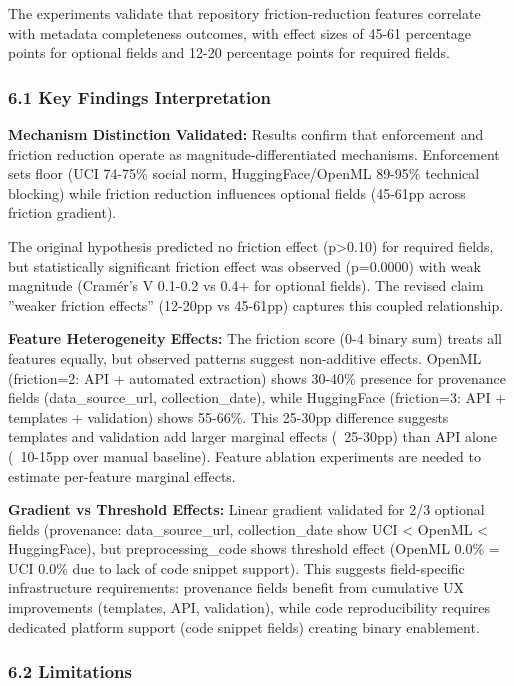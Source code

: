
The experiments validate that repository friction-reduction features correlate with metadata completeness outcomes, with effect sizes of 45-61 percentage points for optional fields and 12-20 percentage points for required fields. 

\subsubsection{6.1 Key Findings Interpretation}

\textbf{Mechanism Distinction Validated:} Results confirm that enforcement and friction reduction operate as magnitude-differentiated mechanisms. Enforcement sets floor (UCI 74-75\% social norm, HuggingFace/OpenML 89-95\% technical blocking) while friction reduction influences optional fields (45-61pp across friction gradient).

The original hypothesis predicted no friction effect (p>0.10) for required fields, but statistically significant friction effect was observed (p=0.0000) with weak magnitude (Cramér's V 0.1-0.2 vs 0.4+ for optional fields). The revised claim ''weaker friction effects'' (12-20pp vs 45-61pp) captures this coupled relationship.

\textbf{Feature Heterogeneity Effects:} The friction score (0-4 binary sum) treats all features equally, but observed patterns suggest non-additive effects. OpenML (friction=2: API + automated extraction) shows 30-40\% presence for provenance fields (data\_source\_url, collection\_date), while HuggingFace (friction=3: API + templates + validation) shows 55-66\%. This 25-30pp difference suggests templates and validation add larger marginal effects (~25-30pp) than API alone (~10-15pp over manual baseline). Feature ablation experiments are needed to estimate per-feature marginal effects.

\textbf{Gradient vs Threshold Effects:} Linear gradient validated for 2/3 optional fields (provenance: data\_source\_url, collection\_date show UCI < OpenML < HuggingFace), but preprocessing\_code shows threshold effect (OpenML 0.0\% = UCI 0.0\% due to lack of code snippet support). This suggests field-specific infrastructure requirements: provenance fields benefit from cumulative UX improvements (templates, API, validation), while code reproducibility requires dedicated platform support (code snippet fields) creating binary enablement.

\subsubsection{6.2 Limitations}

